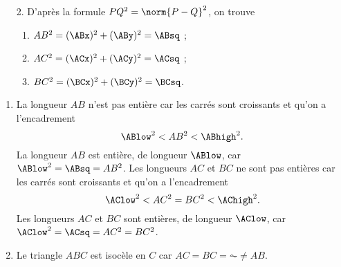 {
	\begin{multicols}{2}
	\begin{enumerate}		
		\item[]
		\begin{center}
		\end{center}
		\item[2.]
		D'après la formule $PQ^2 = \norm{P-Q}^2$, on trouve
		\begin{enumerate}[label=\alph*)]
			\item $AB^2 = (\ABx)^2 + (\ABy)^2 = \ABsq$ ;
			\item $AC^2 = (\ACx)^2 + (\ACy)^2 = \ACsq$ ;
			\item $BC^2 = (\BCx)^2 + (\BCy)^2 = \BCsq$.
		\end{enumerate}
	\end{enumerate}
	\end{multicols}
	\begin{enumerate}\addtocounter{enumi}{2}
		\item
			\ifnum{}
			La longueur $AB$ n'est pas entière car les carrés sont croissants et qu'on a l'encadrement
				\[ \ABlow^2 < AB^2 < \ABhigh^2. \]
			\else
			La longueur $AB$ est entière, de longueur $\ABlow$, car $\ABlow^2 = \ABsq = AB^2$.
			\fi
			\ifnum{}
			Les longueurs $AC$ et $BC$ ne sont pas entières car les carrés sont croissants et qu'on a l'encadrement
				\[ \AClow^2 < AC^2 = BC^2 < \AChigh^2. \]
			\else
			Les longueurs $AC$ et $BC$ sont entières, de longueur $\AClow$, car $\AClow^2 = \ACsq = AC^2 = BC^2$.
			\fi
		\item
		Le triangle $ABC$ est isocèle en $C$ car $AC = BC = \AC \neq AB$.
	\end{enumerate}
}


\newpage
{}
\shipoutAnswer




